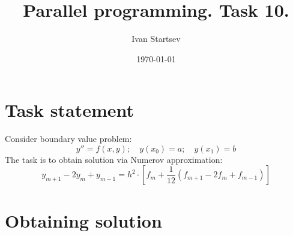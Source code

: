 \documentclass[12pt, letterpaper]{article}
\title{Parallel programming. Task 10.}
\author{Ivan Startsev}
\date{\today}
\begin{document}
	\maketitle
	\section{Task statement}
	Consider boundary value problem:
	\begin{equation}
		y'' = f(x, y); \quad y(x_0) = a; \quad y(x_1) = b
	\end{equation}
	The task is to obtain solution via Numerov approximation:
	\begin{equation}
	y_{m+1} - 2 y_m + y_{m-1} = h^2 \cdot [f_m + \frac{1}{12}(f_{m+1} - 2f_m + f_{m-1})]
	\end{equation}
	\section{Obtaining solution}
\end{document}
